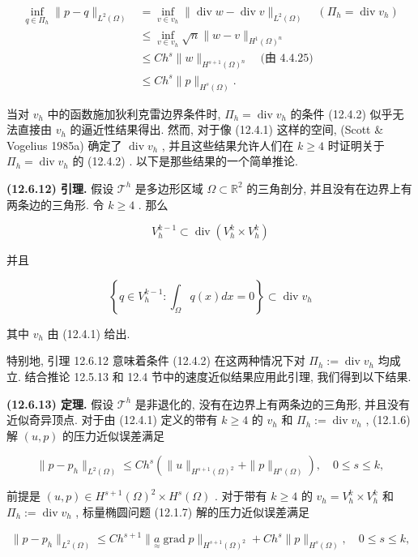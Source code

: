 \begin{align*}
\inf_{q \in \varPi_{h}} \|p - q\|_{L^{2}(\Omega)} &= \inf_{v \in v_{h}} \|\operatorname{div}w - \operatorname{div}v\|_{L^{2}(\Omega)} \quad (\varPi_{h} = \operatorname{div}v_{h}) \\
&\leq \inf_{v \in v_{h}} \sqrt{n} \|w - v\|_{H^{1}(\Omega)^{n}} \\
&\leq C h^{s} \|w\|_{H^{s + 1}(\Omega)^{n}} \quad \text{(由 4.4.25)} \\
&\leq C h^{s} \|p\|_{H^{s}(\Omega)}.
\end{align*}

当对 $v_{h}$ 中的函数施加狄利克雷边界条件时, $\varPi_{h} = \operatorname{div}v_{h}$ 的条件 (12.4.2) 似乎无法直接由 $v_{h}$ 的逼近性结果得出. 然而, 对于像 (12.4.1) 这样的空间, (Scott \& Vogelius 1985a) 确定了 $\operatorname{div}v_{h}$ , 并且这些结果允许人们在 $k \geq 4$ 时证明关于 $\varPi_{h} = \operatorname{div}v_{h}$ 的 (12.4.2) . 以下是那些结果的一个简单推论.

\textbf{(12.6.12) 引理.} 假设 $\mathcal{T}^{h}$ 是多边形区域 $\Omega \subset \mathbb{R}^{2}$ 的三角剖分, 并且没有在边界上有两条边的三角形. 令 $k \geq 4$ . 那么

$$
V_{h}^{k - 1} \subset \operatorname{div}(V_{h}^{k} \times V_{h}^{k})
$$

并且

$$
\left\{ q \in V_{h}^{k - 1} : \int_{\Omega} q(x) dx = 0 \right\} \subset \operatorname{div}v_{h}
$$

其中 $v_{h}$ 由 (12.4.1) 给出.

特别地, 引理 12.6.12 意味着条件 (12.4.2) 在这两种情况下对 $\varPi_{h} \mathrel{\text{:=}} \operatorname{div}v_{h}$ 均成立. 结合推论 12.5.13 和 12.4 节中的速度近似结果应用此引理, 我们得到以下结果.

\textbf{(12.6.13) 定理.} 假设 $\mathcal{T}^{h}$ 是非退化的, 没有在边界上有两条边的三角形, 并且没有近似奇异顶点. 对于由 (12.4.1) 定义的带有 $k \geq 4$ 的 $v_{h}$ 和 $\varPi_{h} \mathrel{\text{:=}} \operatorname{div}v_{h}$ , (12.1.6) 解 $(u,p)$ 的压力近似误差满足

$$
\|p - p_{h}\|_{L^{2}(\Omega)} \leq C h^{s} (\|u\|_{H^{s + 1}(\Omega)^{2}} + \|p\|_{H^{s}(\Omega)}), \quad 0 \leq s \leq k,
$$

前提是 $(u,p) \in H^{s + 1}(\Omega)^{2} \times H^{s}(\Omega)$ . 对于带有 $k \geq 4$ 的 $v_{h} = V_{h}^{k} \times V_{h}^{k}$ 和 $\varPi_{h} \mathrel{\text{:=}} \operatorname{div}v_{h}$ , 标量椭圆问题 (12.1.7) 解的压力近似误差满足

$$
\|p - p_{h}\|_{L^{2}(\Omega)} \leq C h^{s + 1} \|\underset{\approx}{a} \operatorname{grad}p\|_{H^{s + 1}(\Omega)^{2}} + C h^{s} \|p\|_{H^{s}(\Omega)}, \quad 0 \leq s \leq k,
$$

